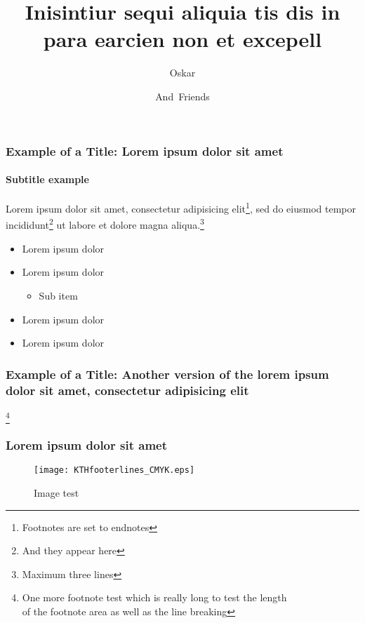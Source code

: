 \documentclass[t]{beamer}
\title[Inisintiur sequi aliquia tis dis in para] 
{%
  Inisintiur sequi aliquia tis dis in para earcien non et excepell%
}
\author[Oskar, Friends]
{
Oskar \and
And~Friends
}
\institute{}
\date{}
\begin{document}
\begin{frame}
\titlepage
\end{frame}


\begin{frame}
\frametitle{Example of a Title: Lorem ipsum dolor sit amet}
\framesubtitle{Subtitle example}

Lorem ipsum dolor sit amet, consectetur adipisicing elit\footnote{Footnotes are set to endnotes}, sed do eiusmod tempor incididunt\footnote{And they appear here} ut labore et dolore magna aliqua.\footnote{Maximum three lines}

\begin{itemize}
\item Lorem ipsum dolor
\item Lorem ipsum dolor
\begin{itemize}
\item Sub item
\end{itemize}
\item Lorem ipsum dolor
\item Lorem ipsum dolor
\end{itemize}


\footnoteblock{}

\end{frame}

\begin{frame}
\frametitle{Example of a Title: Another version of the lorem ipsum dolor sit amet, consectetur adipisicing elit}

\lipsum[2]\footnote{One more footnote test which is really long to test the length \\ of the footnote area as well as the line breaking}

\footnoteblock{}

\end{frame}


\begin{frame}
\frametitle{Lorem ipsum dolor sit amet}

\lipsum[4]

\begin{figure}[h!]
\texttt{[image: KTHfooterlines\_CMYK.eps]}
\caption{Image test}
\end{figure}


\end{frame}
\end{document}
